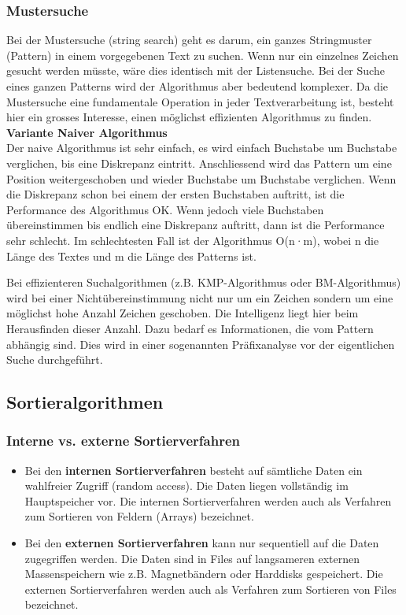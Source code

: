 \subsubsection{Mustersuche}
Bei der Mustersuche (string search) geht es darum, ein ganzes Stringmuster (Pattern) in einem vorgegebenen Text zu suchen. Wenn nur ein einzelnes Zeichen gesucht werden müsste, wäre dies identisch mit der Listensuche. Bei der Suche eines ganzen Patterns wird der Algorithmus aber bedeutend komplexer. Da die Mustersuche eine fundamentale Operation in jeder Textverarbeitung ist, besteht hier ein grosses Interesse, einen möglichst effizienten Algorithmus zu finden.\\

\textbf{Variante Naiver Algorithmus}\\
Der naive Algorithmus ist sehr einfach, es wird einfach Buchstabe um Buchstabe verglichen, bis eine Diskrepanz eintritt. Anschliessend wird das Pattern um eine Position weitergeschoben und wieder
Buchstabe um Buchstabe verglichen. Wenn die Diskrepanz schon bei einem der ersten Buchstaben auftritt, ist die Performance des Algorithmus OK. Wenn jedoch viele Buchstaben übereinstimmen bis endlich eine Diskrepanz auftritt, dann ist die Performance sehr schlecht. Im schlechtesten Fall ist der Algorithmus O(n·m), wobei n die Länge des Textes und m die Länge des Patterns ist.

Bei effizienteren Suchalgorithmen (z.B. KMP-Algorithmus oder BM-Algorithmus) wird bei einer Nichtübereinstimmung nicht nur um ein Zeichen sondern um eine möglichst hohe Anzahl Zeichen geschoben. Die Intelligenz liegt hier beim Herausfinden dieser Anzahl. Dazu bedarf es Informationen, die vom Pattern abhängig sind. Dies wird in einer sogenannten Präfixanalyse vor der eigentlichen Suche durchgeführt.


\subsection{Sortieralgorithmen}

\subsubsection{Interne vs. externe Sortierverfahren}
\begin{itemize}
    \item Bei den \textbf{internen Sortierverfahren} besteht auf sämtliche Daten ein wahlfreier Zugriff (random access). Die Daten liegen vollständig im Hauptspeicher vor. Die internen Sortierverfahren werden auch als Verfahren zum Sortieren von Feldern (Arrays) bezeichnet.
    \item Bei den \textbf{externen Sortierverfahren} kann nur sequentiell auf die Daten zugegriffen werden. Die Daten sind in Files auf langsameren externen Massenspeichern wie z.B. Magnetbändern oder Harddisks gespeichert. Die externen Sortierverfahren werden auch als Verfahren zum Sortieren von Files bezeichnet.
\end{itemize}

